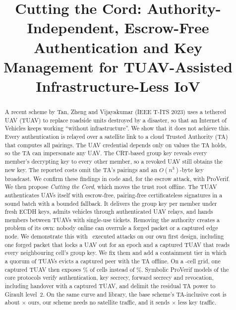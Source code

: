 \documentclass[conference]{IEEEtran}
\begin{document}
\title{Cutting the Cord: Authority-Independent, Escrow-Free Authentication and Key Management for TUAV-Assisted Infrastructure-Less IoV}

\author{
}

\maketitle

\begin{abstract}
A recent scheme by Tan, Zheng and Vijayakumar (IEEE T-ITS 2023) uses a tethered UAV (TUAV) to replace roadside units destroyed by a disaster, so that an
Internet of Vehicles keeps working ``without infrastructure''. We show that it does not achieve this. Every authentication is relayed over a satellite link
to a cloud Trusted Authority (TA) that computes all pairings. The UAV credential depends only on values the TA holds, so the TA can impersonate any UAV.
The CRT-based group key reveals every member's decrypting key to every other member, so a revoked UAV still obtains the new key. The reported costs omit the
TA's pairings and an $O(n^3)$-byte key broadcast. We confirm these findings in code and, for the escrow attack, with ProVerif. We then propose
\emph{Cutting the Cord}, which moves the trust root offline. The TUAV authenticates UAVs itself with escrow-free, pairing-free certificateless signatures in a
sound batch with a bounded fallback. It delivers the group key per member under fresh ECDH keys, admits vehicles through authenticated UAV relays, and hands
members between TUAVs with single-use tickets. Removing the authority creates a problem of its own: nobody online can overrule a forged packet or a captured edge
node. We demonstrate this with \EAttacksVOne\ executed attacks on our own first design, including one forged packet that locks a UAV out for an epoch and a captured
TUAV that reads every neighbouring cell's group key. We fix them and add a containment tier in which a quorum of TUAVs evicts a captured peer with the TA offline. On
a \EBlastCells-cell grid, one captured TUAV then exposes \EBlastHardOne\% of cells instead of \EBlastFirstOne\%. Symbolic ProVerif models of the core protocols verify
authentication, key secrecy, forward secrecy and revocation, including handover with a captured TUAV, and delimit the residual TA power to Girault level~2. On the same curve and library, the base scheme's
TA-inclusive cost is about \RSpeedup$\times$ ours, our scheme needs no satellite traffic, and it sends \RBytesRatio$\times$ less key traffic.
\end{abstract}
\end{document}

